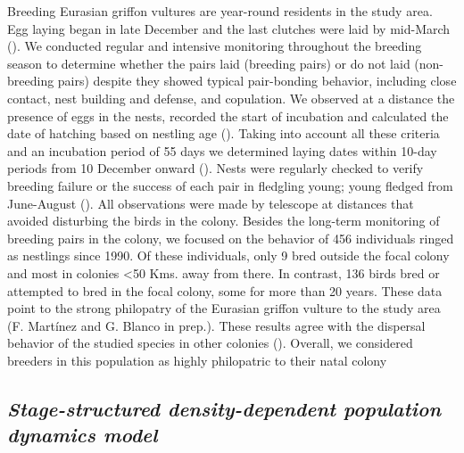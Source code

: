 \documentclass[12pt]{article}
\begin{document}
Breeding Eurasian griffon vultures are year-round residents in the study area. Egg laying began in late December and the last clutches were laid by mid-March (\cite{Martinez1998}). We conducted regular and intensive monitoring throughout the breeding season to determine whether the pairs laid (breeding pairs) or do not laid (non-breeding pairs) despite they showed typical pair-bonding behavior, including close contact, nest building and defense, and copulation. We observed at a distance the presence of eggs in the nests, recorded the start of incubation and calculated the date of hatching based on nestling age (\cite{Elosegui1989}). Taking into account all these criteria and an incubation period of 55 days we determined laying dates within 10-day periods from 10 December onward (\cite{Martinez1998}). Nests were regularly checked to verify breeding failure or the success of each pair in fledgling young; young fledged from June-August (\cite{Fargallo2018}). All observations were made by telescope at distances that avoided disturbing the birds in the colony. Besides the long-term monitoring of breeding pairs in the colony, we focused on the behavior of 456 individuals ringed as nestlings since 1990. Of these individuals, only 9 bred outside the focal colony and most in colonies <50 Kms. away from there. In contrast, 136 birds bred or attempted to bred in the focal colony, some for more than 20 years. These data point to the strong philopatry of the Eurasian griffon vulture to the study area (F. Martínez and G. Blanco in prep.). These results agree with the dispersal behavior of the studied species in other colonies (\cite{Zuberogoitia2013}). Overall, we considered breeders in this population as highly philopatric to their natal colony


\subsection*{\textit{Stage-structured density-dependent population dynamics model}}
\end{document}
